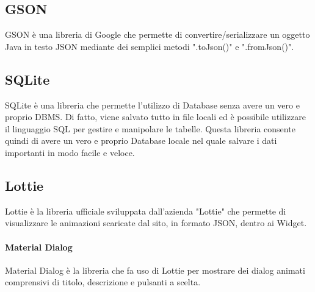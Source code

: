 \subsection{GSON}
GSON \cite{gson} è una libreria di Google che permette di convertire/serializzare un oggetto Java in testo JSON mediante dei semplici metodi ".toJson()" e ".fromJson()".

\subsection{SQLite}
SQLite \cite{sqlite} è una libreria che permette l'utilizzo di Database senza avere un vero e proprio DBMS. Di fatto, viene salvato tutto in file locali ed è possibile utilizzare il linguaggio SQL per gestire e manipolare le tabelle. Questa libreria consente quindi di avere un vero e proprio Database locale nel quale salvare i dati importanti in modo facile e veloce.

\subsection{Lottie}
Lottie \cite{lottie} è la libreria ufficiale sviluppata dall'azienda "Lottie" che permette di visualizzare le animazioni scaricate dal sito, in formato JSON, dentro ai Widget.

\paragraph{Material Dialog}
Material Dialog \cite{material_dialog} è la libreria che fa uso di Lottie per mostrare dei dialog animati comprensivi di titolo, descrizione e pulsanti a scelta.